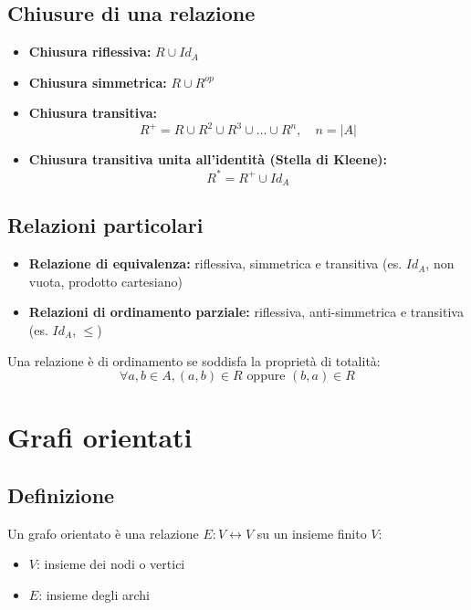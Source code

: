 \documentclass[a4paper,12pt]{article}
\let\oldsection\section
\renewcommand{\section}{\clearpage\oldsection}
\begin{document}
\subsection{Chiusure di una relazione}

\begin{itemize}
    \item \textbf{Chiusura riflessiva:} $R \cup Id_A$
    \item \textbf{Chiusura simmetrica:} $R \cup R^{op}$
    \item \textbf{Chiusura transitiva:} 
    \[
    R^+ = R \cup R^2 \cup R^3 \cup \dots \cup R^n, \quad n = |A|
    \]
    \item \textbf{Chiusura transitiva unita all'identità (Stella di Kleene):} 
    \[
    R^* = R^+ \cup Id_A
    \]
\end{itemize}

\subsection{Relazioni particolari}

\begin{itemize}
    \item \textbf{Relazione di equivalenza:} riflessiva, simmetrica e transitiva (es. $Id_A$, non vuota, prodotto cartesiano)
    \item \textbf{Relazioni di ordinamento parziale:} riflessiva, anti-simmetrica e transitiva (es. $Id_A$, $\leq$)
\end{itemize}

Una relazione è di ordinamento se soddisfa la proprietà di totalità:
\[
\forall a,b \in A, (a,b) \in R \text{ oppure } (b,a) \in R
\]

\section{Grafi orientati}

\subsection{Definizione}

Un grafo orientato è una relazione $E: V \leftrightarrow V$ su un insieme finito $V$:

\begin{itemize}
    \item $V$: insieme dei nodi o vertici
    \item $E$: insieme degli archi
\end{itemize}
\end{document}
